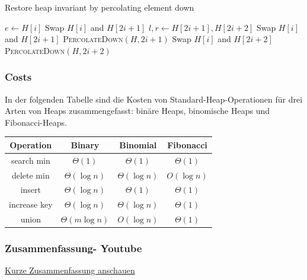 \documentclass[a4paper]{article}
\begin{document}
\begin{algorithm}
\caption{Restore heap invariant by percolating element down} 
\label{alg:DurchsickernHeap}
\begin{algorithmic}[1] 
   
  \State $e \gets H\left[i\right]$
  \State Swap $H\left[i\right]$ and $H\left[2i+1\right]$
  \EndIf
  \State $l, r \gets H\left[2i+1\right], H\left[2i+2\right]$
  \State Swap $H\left[i\right]$ and $H\left[2i+1\right]$
  \State \textsc{PercolateDown}$\left(H, 2i+1\right)$
  \EndIf
  \Else
  \State Swap $H\left[i\right]$ and $H\left[2i+2\right]$
  \State \textsc{PercolateDown}$\left(H, 2i+2\right)$
  \EndIf
  \EndIf
  \EndIf  
  \EndFunction
\end{algorithmic}
\end{algorithm}

\subsubsection*{Costs}

In der folgenden Tabelle sind die Kosten von Standard-Heap-Operationen für drei Arten von Heaps zusammengefasst: binäre Heaps, binomische Heaps und Fibonacci-Heaps. \\

\begin{tabular}{|c|c|c|c|}
  \hline
  \label{Tab: KostenHeaps}
\textbf{Operation}    & \textbf{Binary}             & \textbf{Binomial}         & \textbf{Fibonacci}   \\
\hline
search min   & $\Theta(1)$        & $\Theta(1)$      & $\Theta(1)$ \\
delete min   & $\Theta(\log n)$   & $\Theta(\log n)$ & $O(\log n)$ \\
insert       & $\Theta(\log n)$   & $\Theta(1)$      & $\Theta(1)$ \\
increase key & $\Theta(\log n)$   & $\Theta(\log n)$ & $\Theta(1)$ \\
  union        & $\Theta(m \log n)$ & $O(\log n)$      & $\Theta(1)$  \\
                                                         \hline
\end{tabular}


\subsubsection*{Zusammenfassung- Youtube}
\href{https://www.youtube.com/watch?v=0wPlzMU-k00}{Kurze Zusammenfassung anschauen}
\end{document}
